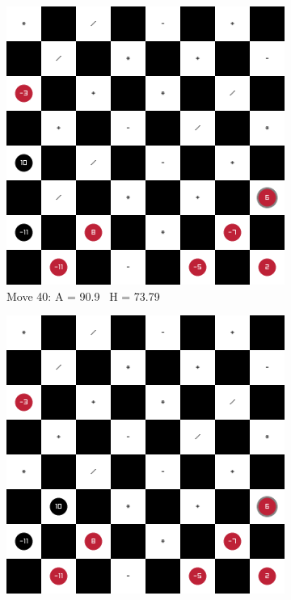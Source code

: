 \begin{figure}[H]
    \centering
    \begin{subfigure}{0.3\textwidth}
        \centering
        \includegraphics[width=\textwidth]{images/games/game5/move_40.png}
        \caption*{Move 40: A = 90.9 \textbar\ H = 73.79}
    \end{subfigure}
    \quad
    \begin{subfigure}{0.3\textwidth}
        \centering
        \includegraphics[width=\textwidth]{images/games/game5/move_41.png}

\end{subfigure}
\end{figure}
